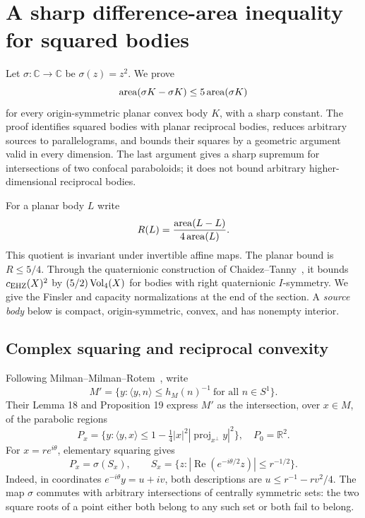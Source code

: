 \section{A sharp difference-area inequality for squared bodies}
\label{sec:squared}
Let $\sigma:\mathbb C\to\mathbb C$ be $\sigma(z)=z^2$. We prove
\[
 \operatorname{area}(\sigma K-\sigma K)\leq5\operatorname{area}(\sigma K)
\]
for every origin-symmetric planar convex body $K$, with a sharp constant.
The proof identifies squared bodies with planar reciprocal bodies, reduces
arbitrary sources to parallelograms, and bounds their squares by a geometric
argument valid in every dimension. The last argument gives a sharp
supremum for intersections of two confocal paraboloids; it does not bound
arbitrary higher-dimensional reciprocal bodies.

For a planar body $L$ write
\[
 R(L)=\frac{\operatorname{area}(L-L)}{4\operatorname{area}(L)}.
\]
This quotient is invariant under invertible affine maps. The planar bound
is $R\leq5/4$. Through the quaternionic construction of
Chaidez--Tanny~\cite{CT2026}, it bounds $c_{\mathrm{EHZ}}(X)^2$ by
$(5/2)\operatorname{Vol}_4(X)$ for bodies with right quaternionic $I$-symmetry.
We give the Finsler and capacity normalizations at the end of the section.
A \emph{source body} below is compact, origin-symmetric, convex, and has
nonempty interior.

\subsection{Complex squaring and reciprocal convexity}
Following Milman--Milman--Rotem~\cite{MMR2018}, write
\[
 M'=\{y:\langle y,n\rangle\leq h_M(n)^{-1}\ \text{for all }n\in S^1\}.
\]
Their Lemma 18 and Proposition 19 express $M'$ as the intersection, over $x\in M$, of the parabolic regions
\[
 P_x=\{y:\langle y,x\rangle\leq 1-\tfrac14|x|^2|\operatorname{proj}_{x^\perp}y|^2\},\quad P_0=\mathbb R^2.
\]
For $x=re^{i\theta}$, elementary squaring gives
\[
 P_x=\sigma(S_x),\qquad S_x=\{z:|\operatorname{Re}(e^{-i\theta/2}z)|\leq r^{-1/2}\}.
\]
Indeed, in coordinates $e^{-i\theta}y=u+iv$, both descriptions are $u\leq r^{-1}-rv^2/4$. The map $\sigma$ commutes with arbitrary intersections of centrally symmetric sets: the two square roots of a point either both belong to any such set or both fail to belong.

